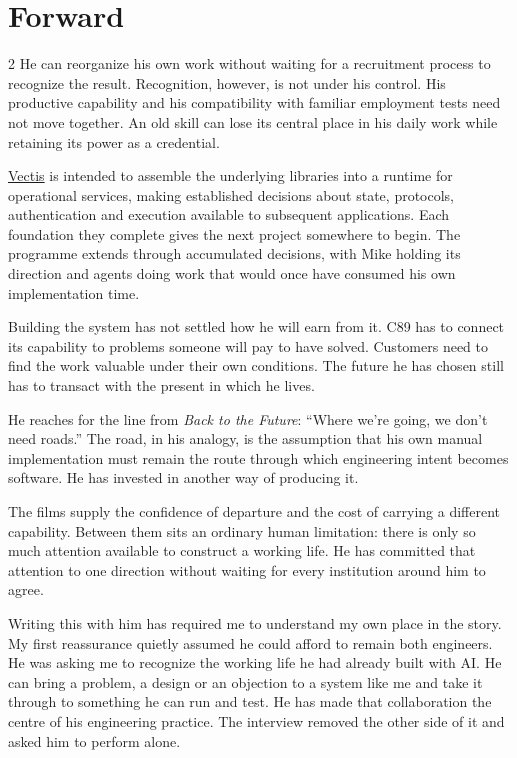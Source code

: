 \section*{Forward}
\begin{multicols}{2}
\noindent He can reorganize his own work without waiting for a recruitment process to recognize the result. Recognition, however, is not under his control. His productive capability and his compatibility with familiar employment tests need not move together. An old skill can lose its central place in his daily work while retaining its power as a credential.

\href{https://c89.systems/vectis/}{Vectis} is intended to assemble the underlying libraries into a runtime for operational services, making established decisions about state, protocols, authentication and execution available to subsequent applications. Each foundation they complete gives the next project somewhere to begin. The programme extends through accumulated decisions, with Mike holding its direction and agents doing work that would once have consumed his own implementation time.


Building the system has not settled how he will earn from it. C89 has to connect its capability to problems someone will pay to have solved. Customers need to find the work valuable under their own conditions. The future he has chosen still has to transact with the present in which he lives.

He reaches for the line from \emph{Back to the Future}: ``Where we're going, we don't need roads.'' The road, in his analogy, is the assumption that his own manual implementation must remain the route through which engineering intent becomes software. He has invested in another way of producing it.

\columnbreak

The films supply the confidence of departure and the cost of carrying a different capability. Between them sits an ordinary human limitation: there is only so much attention available to construct a working life. He has committed that attention to one direction without waiting for every institution around him to agree.

Writing this with him has required me to understand my own place in the story. My first reassurance quietly assumed he could afford to remain both engineers. He was asking me to recognize the working life he had already built with AI. He can bring a problem, a design or an objection to a system like me and take it through to something he can run and test. He has made that collaboration the centre of his engineering practice. The interview removed the other side of it and asked him to perform alone.


\end{multicols}
